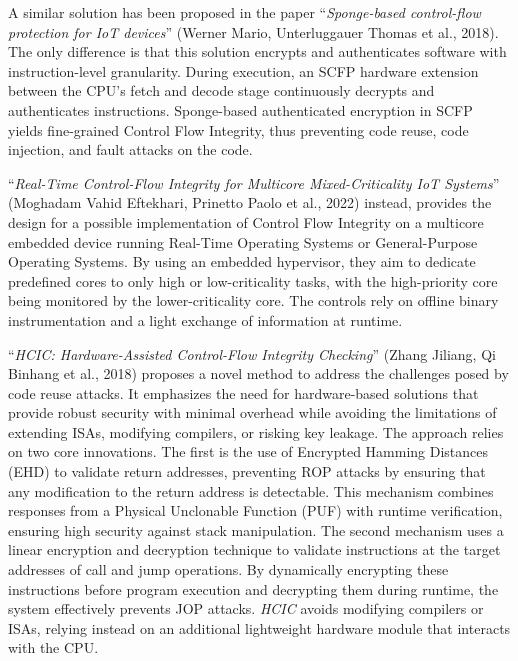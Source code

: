 A similar solution has been proposed in the paper ``\textit{Sponge-based control-flow
protection for IoT devices}'' (Werner Mario, Unterluggauer Thomas et al., 2018)\cite{Sponge}.
The only difference is that this solution encrypts and authenticates software with
instruction-level granularity. During execution, an SCFP hardware extension between
the CPU's fetch and decode stage continuously decrypts and authenticates instructions.
Sponge-based authenticated encryption in SCFP yields ﬁne-grained Control Flow
Integrity, thus preventing code reuse, code injection, and fault attacks on the code.

``\textit{Real-Time Control-Flow Integrity for Multicore Mixed-Criticality IoT
Systems}'' (Moghadam Vahid Eftekhari, Prinetto Paolo et al., 2022)\cite{multicorecfi}
instead, provides the design for a possible implementation of Control Flow Integrity
on a multicore embedded device running Real-Time Operating Systems or General-Purpose
Operating Systems. By using an embedded hypervisor, they aim to dedicate predefined
cores to only high or low-criticality tasks, with the high-priority core being
monitored by the lower-criticality core. The controls rely on offline binary instrumentation
and a light exchange of information at runtime.

``\textit{HCIC: Hardware-Assisted Control-Flow Integrity Checking}'' (Zhang Jiliang,
Qi Binhang et al., 2018)\cite{HCIC} proposes a novel method to address the
challenges posed by code reuse attacks. It emphasizes the need for hardware-based
solutions that provide robust security with minimal overhead while avoiding the limitations
of extending ISAs, modifying compilers, or risking key leakage. The approach
relies on two core innovations. The first is the use of Encrypted Hamming Distances
(EHD) to validate return addresses, preventing ROP attacks by ensuring that any
modification to the return address is detectable. This mechanism combines responses
from a Physical Unclonable Function (PUF) with runtime verification, ensuring
high security against stack manipulation. The second mechanism uses a linear encryption
and decryption technique to validate instructions at the target addresses of call
and jump operations. By dynamically encrypting these instructions before program
execution and decrypting them during runtime, the system effectively prevents JOP
attacks. \textit{HCIC} avoids modifying compilers or ISAs, relying instead on an
additional lightweight hardware module that interacts with the CPU.

